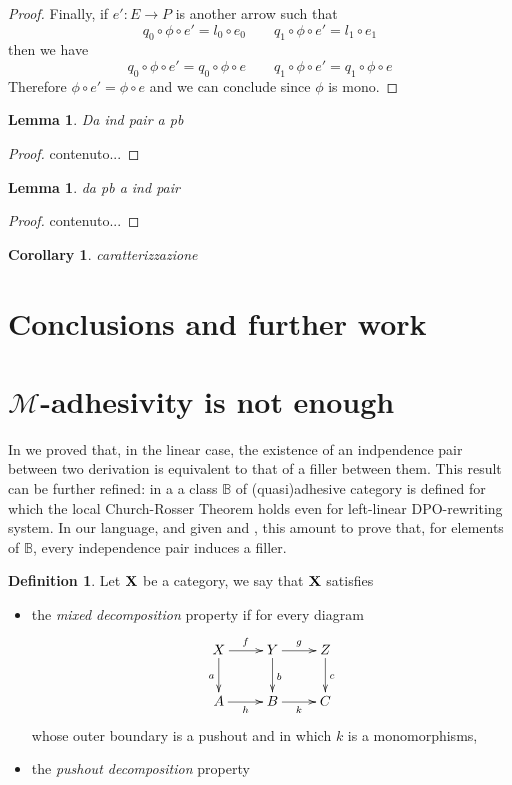\documentclass[a4paper]{article}
\def\X{\textbf {\textup{X}}}
\newtheorem{lemma}[theorem]{Lemma}
\newtheorem{corollary}[theorem]{Corollary}
\theoremstyle{definition}
\newtheorem{definition}[theorem]{Definition}
\begin{document}
\begin{proof}
Finally, if $e'\colon E \to P$ is another arrow such that 		
\[q_0\circ \phi\circ e'=l_0\circ e_0 \qquad q_1\circ \phi\circ e'=l_1\circ e_1\]
then we have 
\[q_0\circ \phi\circ e'=q_0\circ \phi\circ e \qquad q_1\circ \phi\circ e'=q_1\circ \phi\circ e\]
Therefore $\phi\circ e'=\phi \circ e$ and we can conclude since $\phi$ is mono.
	\end{proof}


\begin{lemma}
	Da ind pair a pb
\end{lemma}

\begin{proof}
	contenuto...
\end{proof}

\begin{lemma}
	da pb a ind pair
\end{lemma}
\begin{proof}
	contenuto...
\end{proof}

\begin{corollary}
	caratterizzazione
\end{corollary}

\section{Conclusions and further work}








\appendix


\section{$\mathcal{M}$-adhesivity is not enough}\label{app:fill}
 In  we proved that, in the linear case, the existence of an indpendence pair between two derivation is equivalent to that of a filler between them. This result can be further refined: in a\cite{baldan2011adhesivity} a class  $\mathbb{B}$ of (quasi)adhesive category is defined for which the local Church-Rosser Theorem holds even for left-linear DPO-rewriting system. In our language, and given  and , this amount to prove that, for elements of $\mathbb{B}$, every independence pair induces a filler. 

\begin{definition}Let $\X$ be a category, we say that $\X$ satisfies
	\begin{itemize}
		\item the \emph{mixed decomposition} property if for every diagram
		\[\xymatrix{X \ar[d]_{a} \ar[r]^{f}& \ar[r]^{g} Y \ar[d]^{b}& Z \ar[d]^{c}\\ A \ar[r]_{h}& B \ar[r]_{k}& C}\]
		whose outer boundary is a pushout and in which $k$ is a monomorphisms, 
		\item the \emph{pushout decomposition} property
	\end{itemize}
\end{definition}
\end{document}
